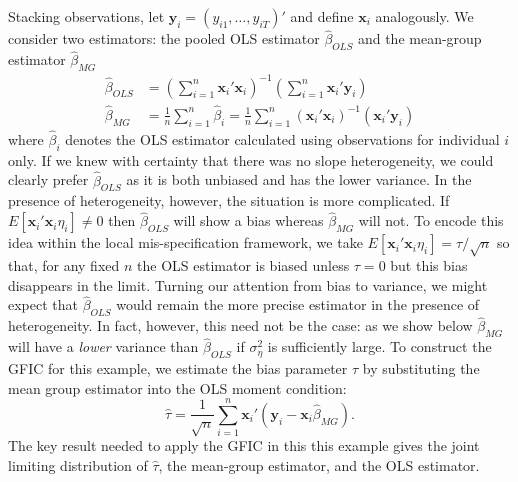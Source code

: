 Stacking observations, let $\mathbf{y}_i = (y_{i1}, \ldots, y_{iT})'$ and define $\mathbf{x}_i$ analogously. 
We consider two estimators: the pooled OLS estimator $\widehat{\beta}_{OLS}$ and the mean-group estimator $\widehat{\beta}_{MG}$
\begin{align}
\widehat{\beta}_{OLS} &= \left(\sum_{i=1}^{n} \mathbf{x}_i'  \mathbf{x}_i \right)^{-1}\left(\sum_{i=1}^{n} \mathbf{x}_i' \mathbf{y}_i   \right)\\ 
\widehat{\beta}_{MG}  &= \frac{1}{n}\sum_{i=1}^n \widehat{\beta}_i 
= \frac{1}{n} \sum_{i=1}^n \left( \mathbf{x}_i'  \mathbf{x}_i\right)^{-1}\left( \mathbf{x}_i'  \mathbf{y}_i   \right)
\end{align}
where $\widehat{\beta}_i$ denotes the OLS estimator calculated using observations for individual $i$ only. 
If we knew with certainty that there was no slope heterogeneity, we could clearly prefer $\widehat{\beta}_{OLS}$ as it is both unbiased and has the lower variance.
In the presence of heterogeneity, however, the situation is more complicated.
If $E[\mathbf{x}_i' \mathbf{x}_i \eta_i]\neq 0$ then $\widehat{\beta}_{OLS}$ will show a bias whereas $\widehat{\beta}_{MG}$ will not.
To encode this idea within the local mis-specification framework, we take $E[\mathbf{x}_i'\mathbf{x}_i \eta_i] = \tau/\sqrt{n}$ so that, for any fixed $n$ the OLS estimator is biased unless $\tau = 0$ but this bias disappears in the limit.
Turning our attention from bias to variance, we might expect that $\widehat{\beta}_{OLS}$ would remain the more precise estimator in the presence of heterogeneity.
In fact, however, this need not be the case: as we show below $\widehat{\beta}_{MG}$ will have a \emph{lower} variance than $\widehat{\beta}_{OLS}$ if $\sigma_{\eta}^2$ is sufficiently large.
To construct the GFIC for this example, we estimate the bias parameter $\tau$ by substituting the mean group estimator into the OLS moment condition:
\begin{equation}
\widehat{\tau} = \frac{1}{\sqrt{n}} \sum_{i=1}^n \mathbf{x}_i' (\mathbf{y}_i - \mathbf{x}_i \widehat{\beta}_{MG}).
\end{equation}
The key result needed to apply the GFIC in this this example gives the joint limiting distribution of $\widehat{\tau}$, the mean-group estimator, and the OLS estimator.
